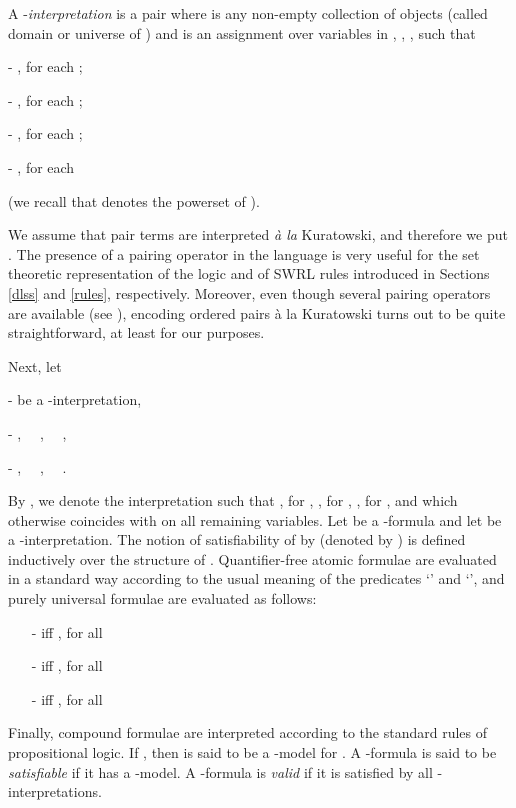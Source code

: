 \documentclass[a4paper]{llncs}
\begin{document}
A -\emph{interpretation} is a pair  where  is any non-empty collection of objects (called domain or universe of ) and  is an assignment over variables in , , ,  such that

\smallskip
{- , for each ;}

{- , for each ;}

{- , for each ; }

{- , for each 

(we recall that  denotes the powerset of ).}

\smallskip
\noindent
We assume that pair terms are interpreted \emph{\`a la} Kuratowski, and therefore we put . The presence of a pairing operator in the language is very useful for the set theoretic representation of the logic  and of SWRL rules introduced in Sections \ref{dlss} and \ref{rules}, respectively. Moreover, even though several pairing operators are available (see \cite{FormisanoOP04}), encoding ordered pairs \`a la Kuratowski turns out to be quite straightforward, at least for our purposes.




Next, let

\smallskip
{-  be a -interpretation,}

{- ,~~ ,~~ ,}

{- ,~~ ,~~ .}

\smallskip
\noindent
By  , we denote the interpretation  such that , for , , for , , for , and which otherwise coincides with  on all remaining variables. Let  be a -formula and let  be a -interpretation. The notion of satisfiability of  by  (denoted by  ) is defined inductively over the structure of . Quantifier-free atomic formulae are evaluated in a standard way according to the usual meaning of the predicates `'
and `', and purely universal formulae are evaluated as follows:
\begin{itemize}
\item[-]{  iff , for all   }
\item[-]{  iff , for all   }
\item[-]{  iff , for all   }
\end{itemize}
Finally, compound formulae are interpreted according to the standard rules of propositional logic. If , then  is said to be a -model for . A -formula is said to be \emph{satisfiable} if it has a -model. A -formula is \emph{valid} if it is satisfied by all -interpretations.
\end{document}
